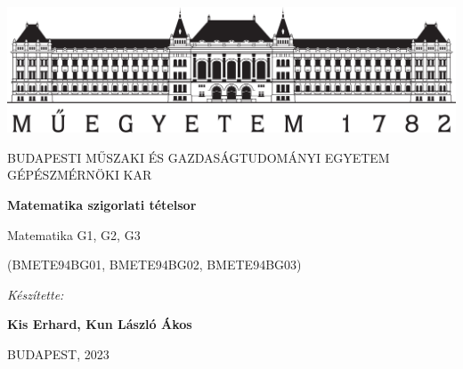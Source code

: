 \documentclass[11pt,a4paper]{article}
\begin{document}
\begin{titlepage}
    \centering
  
    \includegraphics[width=.8\textwidth]{bme_logo_nagy.jpg}
  
    \vspace{1em}
  
    {
      \large
      BUDAPESTI MŰSZAKI ÉS GAZDASÁGTUDOMÁNYI EGYETEM GÉPÉSZMÉRNÖKI KAR
    }
  
    \vspace{8em}
  
    {
      \Huge
      \textbf{Matematika szigorlati tételsor}
    }
  
    \vspace{10em}
  
    {
      \huge
      Matematika G1, G2, G3
  
      \vspace{.2em}
  
      \large
      (BMETE94BG01, BMETE94BG02, BMETE94BG03)
    }
  
    \vspace{4em}
  
    {
      \Large
      \textit{Készítette:}
  
      \vspace{.5em}
  
      \textbf{Kis Erhard, Kun László Ákos}
    }
  
    \vspace{20em}
  
    {
      \large
      BUDAPEST, 2023
    }
  \end{titlepage}
\end{document}
